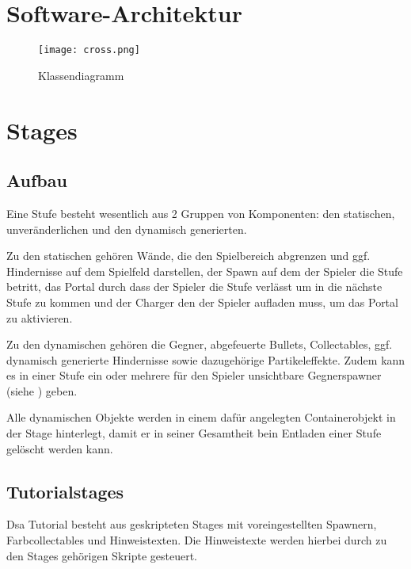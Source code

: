 \documentclass[a4paper,10pt,ngerman,fontsize=12pt]{scrreprt}
\begin{document}
\section{Software-Architektur}

\lipsum[1]

\begin{figure}[h!]
\begin{center}
\texttt{[image: cross.png]}
\caption{Klassendiagramm}
\label{fig:classdiag}
\end{center}
\end{figure}
    



\section{Stages}
\label{sect:stages}


\subsection{Aufbau}

Eine Stufe besteht wesentlich aus 2 Gruppen von Komponenten: den statischen, unveränderlichen und den dynamisch generierten.

Zu den statischen gehören Wände, die den Spielbereich abgrenzen und ggf. Hindernisse auf dem Spielfeld darstellen, der Spawn auf dem der Spieler die Stufe betritt, das Portal durch dass der Spieler die Stufe verlässt um in die nächste Stufe zu kommen und der Charger den der Spieler aufladen muss, um das Portal zu aktivieren.

Zu den dynamischen gehören die Gegner, abgefeuerte Bullets, Collectables, ggf. dynamisch generierte Hindernisse sowie dazugehörige Partikeleffekte. Zudem kann es in einer Stufe ein oder mehrere für den Spieler unsichtbare Gegnerspawner (siehe ) geben.

Alle dynamischen Objekte werden in einem dafür angelegten Containerobjekt in der Stage hinterlegt, damit er in seiner Gesamtheit bein Entladen einer Stufe gelöscht werden kann.



\subsection{Tutorialstages}

Dsa Tutorial besteht aus geskripteten Stages mit voreingestellten Spawnern, Farbcollectables und Hinweistexten. Die Hinweistexte werden hierbei durch zu den Stages gehörigen Skripte gesteuert.
\end{document}
